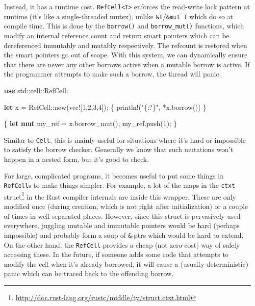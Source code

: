 \documentclass[a4paper,]{book}
\newenvironment{Shaded}{\begin{snugshade}}{\end{snugshade}}
\newcommand{\KeywordTok}[1]{\textcolor[rgb]{0.13,0.29,0.53}{\textbf{{#1}}}}
\newcommand{\DecValTok}[1]{\textcolor[rgb]{0.00,0.00,0.81}{{#1}}}
\newcommand{\StringTok}[1]{\textcolor[rgb]{0.31,0.60,0.02}{{#1}}}
\newcommand{\OtherTok}[1]{\textcolor[rgb]{0.56,0.35,0.01}{{#1}}}
\newcommand{\NormalTok}[1]{{#1}}
\renewcommand{\href}[2]{#2\footnote{\url{#1}}}
\begin{document}
Instead, it has a runtime cost.
\texttt{RefCell\textless{}T\textgreater{}} enforces the read-write lock
pattern at runtime (it's like a single-threaded mutex), unlike
\texttt{\&T}/\texttt{\&mut\ T} which do so at compile time. This is done
by the \texttt{borrow()} and \texttt{borrow\_mut()} functions, which
modify an internal reference count and return smart pointers which can
be dereferenced immutably and mutably respectively. The refcount is
restored when the smart pointers go out of scope. With this system, we
can dynamically ensure that there are never any other borrows active
when a mutable borrow is active. If the programmer attempts to make such
a borrow, the thread will panic.

\begin{Shaded}
\begin{Highlighting}[]
\KeywordTok{use} \NormalTok{std::cell::RefCell;}

\KeywordTok{let} \NormalTok{x = RefCell::new(}\OtherTok{vec!}\NormalTok{[}\DecValTok{1}\NormalTok{,}\DecValTok{2}\NormalTok{,}\DecValTok{3}\NormalTok{,}\DecValTok{4}\NormalTok{]);}
\NormalTok{\{}
    \OtherTok{println!}\NormalTok{(}\StringTok{"\{:?\}"}\NormalTok{, *x.borrow())}
\NormalTok{\}}

\NormalTok{\{}
    \KeywordTok{let} \KeywordTok{mut} \NormalTok{my_ref = x.borrow_mut();}
    \NormalTok{my_ref.push(}\DecValTok{1}\NormalTok{);}
\NormalTok{\}}
\end{Highlighting}
\end{Shaded}

Similar to \texttt{Cell}, this is mainly useful for situations where
it's hard or impossible to satisfy the borrow checker. Generally we know
that such mutations won't happen in a nested form, but it's good to
check.

For large, complicated programs, it becomes useful to put some things in
\texttt{RefCell}s to make things simpler. For example, a lot of the maps
in \href{http://doc.rust-lang.org/rustc/middle/ty/struct.ctxt.html}{the
\texttt{ctxt} struct} in the Rust compiler internals are inside this
wrapper. These are only modified once (during creation, which is not
right after initialization) or a couple of times in well-separated
places. However, since this struct is pervasively used everywhere,
juggling mutable and immutable pointers would be hard (perhaps
impossible) and probably form a soup of \texttt{\&}-ptrs which would be
hard to extend. On the other hand, the \texttt{RefCell} provides a cheap
(not zero-cost) way of safely accessing these. In the future, if someone
adds some code that attempts to modify the cell when it's already
borrowed, it will cause a (usually deterministic) panic which can be
traced back to the offending borrow.
\end{document}
